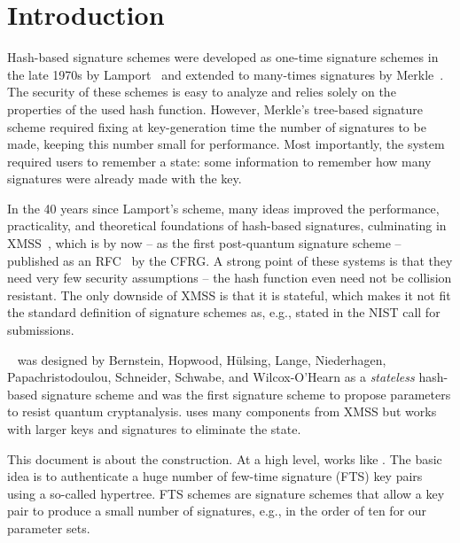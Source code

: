 %
\section{Introduction}
Hash-based signature schemes were developed as one-time signature schemes
in the late 1970s by Lamport~\cite{Lam79}
and extended to many-times signatures by Merkle~\cite{Merkle1990}.
The security of these schemes is easy to analyze and relies
solely on the properties of the used hash function.
However,
Merkle's tree-based signature scheme required fixing at key-generation
time the number of signatures to be made, keeping this number small for
performance. Most importantly, the system required users to remember
a state: some information to remember how many signatures were already
made with the key.

In the 40 years since Lamport's scheme, many ideas improved the
performance, practicality,
and theoretical foundations
of hash-based signatures, culminating in
XMSS~\cite{XMSS}, which is by now -- as the first post-quantum signature scheme --
published as an RFC~\cite{rfc8391} by the CFRG. A strong point of
these systems is that they need very few security assumptions --
the hash function even need not be collision resistant.
The only downside of XMSS is that it
is stateful, which makes it not fit the standard definition of
signature schemes as, e.g., stated in the NIST call for submissions.

\spc ~\cite{Bernstein2015} was designed by Bernstein, Hopwood,
H{\"u}lsing, Lange, Niederhagen, Papachristodoulou, Schneider,
Schwabe, and Wilcox-O'Hearn as a {\em stateless} hash-based signature
scheme and was the first signature scheme to propose parameters to
resist quantum cryptanalysis. \spc uses many components from XMSS
but works with larger keys and signatures to eliminate the state.

This document is about the \spx construction.
At a high level, \spx works like \spc. The basic idea is to authenticate
a huge number of few-time signature (FTS) key pairs using a so-called hypertree.
FTS schemes are signature schemes that allow a key pair to produce a small
number of signatures, e.g., in the order of ten %
for our parameter
sets.

